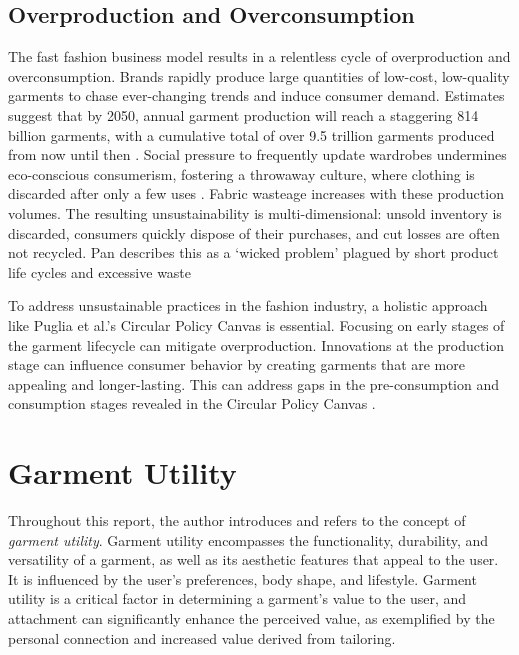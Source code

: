 \subsection{Overproduction and Overconsumption}
The fast fashion business model results in a relentless cycle of overproduction and overconsumption. Brands rapidly produce large quantities of low-cost, low-quality garments to chase ever-changing trends and induce consumer demand. Estimates suggest that by 2050, annual garment production will reach a staggering 814 billion garments, with a cumulative total of over 9.5 trillion garments produced from now until then \cite{charter_accelerating_2024}. Social pressure to frequently update wardrobes undermines eco-conscious consumerism, fostering a throwaway culture, where clothing is discarded after only a few uses \cite{fletcher_fashion_2012}. Fabric wasteage increases with these production volumes. The resulting unsustainability is multi-dimensional: unsold inventory is discarded, consumers quickly dispose of their purchases, and cut losses are often not recycled. Pan describes this as a `wicked problem' plagued by short product life cycles and excessive waste \cite{charter_accelerating_2024}

To address unsustainable practices in the fashion industry, a holistic approach like Puglia et al.'s Circular Policy Canvas is essential. Focusing on early stages of the garment lifecycle can mitigate overproduction. Innovations at the production stage can influence consumer behavior by creating garments that are more appealing and longer-lasting. This can address gaps in the pre-consumption and consumption stages revealed in the Circular Policy Canvas \cite{puglia_circular_2024}.

\section{Garment Utility}
Throughout this report, the author introduces and refers to the concept of \textit{garment utility}. Garment utility encompasses the functionality, durability, and versatility of a garment, as well as its aesthetic features that appeal to the user. It is influenced by the user's preferences, body shape, and lifestyle. Garment utility is a critical factor in determining a garment's value to the user, and attachment can significantly enhance the perceived value, as exemplified by the personal connection and increased value derived from tailoring.

